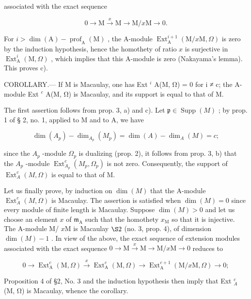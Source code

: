 associated with the exact sequence

\[
0 \to \mathrm{M} \xrightarrow {x} \mathrm{M} \longrightarrow \mathrm{M} / x \mathrm{M} \to 0.
\]

For \(i > \dim(\mathrm{A}) - \operatorname{prof}_{\mathrm{A}}(\mathrm{M})\) , the A-module \(\operatorname{Ext}_{\mathrm{A}}^{i+1}(\mathrm{M}/x\mathrm{M},\Omega)\) is zero by the induction hypothesis, hence the homothety of ratio \(x\) is surjective in \(\operatorname{Ext}_{\mathrm{A}}^{i}(\mathrm{M},\Omega)\) , which implies that this A-module is zero (Nakayama's lemma). This proves c).

COROLLARY.--- If M is Macaulay, one has Ext \(^{i}\) A(M, Ω) = 0 for i ≠ c; the A-module Ext \(^{c}\) A(M, Ω) is Macaulay, and its support is equal to that of M.

The first assertion follows from prop. 3, a) and c). Let \(\mathfrak{p} \in \operatorname{Supp}(M)\) ; by prop. 1 of § 2, no. 1, applied to M and to A, we have

\[
\dim (A _ {p}) - \dim_ {A _ {p}} (M _ {p}) = \dim (A) - \dim_ {A} (M) = c;
\]

since the \(A_{p}\) -module \(\Omega_{p}\) is dualizing (prop. 2), it follows from prop. 3, b) that the \(A_{p}\) -module \(\operatorname{Ext}_{A_{p}}^{c}(M_{p},\Omega_{p})\) is not zero. Consequently, the support of \(\operatorname{Ext}_{A}^{c}(M,\Omega)\) is equal to that of M.

Let us finally prove, by induction on \(\dim(M)\) that the A-module \(\operatorname{Ext}_{A}^{c}(M,\Omega)\) is Macaulay. The assertion is satisfied when \(\dim(M)=0\) since every module of finite length is Macaulay. Suppose \(\dim(M)>0\) and let us choose an element \(x\) of \(\mathfrak{m}_{\mathrm{A}}\) such that the homothety \(x_{\mathrm{M}}\) so that it is injective. The A-module M/ \(x\mathrm{M}\) is Macaulay \(\S 2\) (no. 3, prop. 4), of dimension \(\dim(M)-1\) . In view of the above, the exact sequence of extension modules associated with the exact sequence \(0\to\mathrm{M}\xrightarrow{x}\mathrm{M}\longrightarrow\mathrm{M}/x\mathrm{M}\to0\) reduces to

\[
0 \to \operatorname{Ext} _ {\mathrm{A}} ^ {c} (\mathrm{M}, \Omega) \xrightarrow {x} \operatorname{Ext} _ {\mathrm{A}} ^ {c} (\mathrm{M}, \Omega) \longrightarrow \operatorname{Ext} _ {\mathrm{A}} ^ {c + 1} (\mathrm{M} / x \mathrm{M}, \Omega) \to 0;
\]

Proposition 4 of §2, No. 3 and the induction hypothesis then imply that Ext \(_{A}^{c}\) (M, Ω) is Macaulay, whence the corollary.


